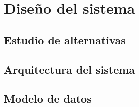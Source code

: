 \chapter{Diseño del sistema}\label{chap:diseño}
\section{Estudio de alternativas}\label{sec:estudio}

\section{Arquitectura del sistema}\label{sec:arquitectura}

\section{Modelo de datos}\label{sec:modelo}
